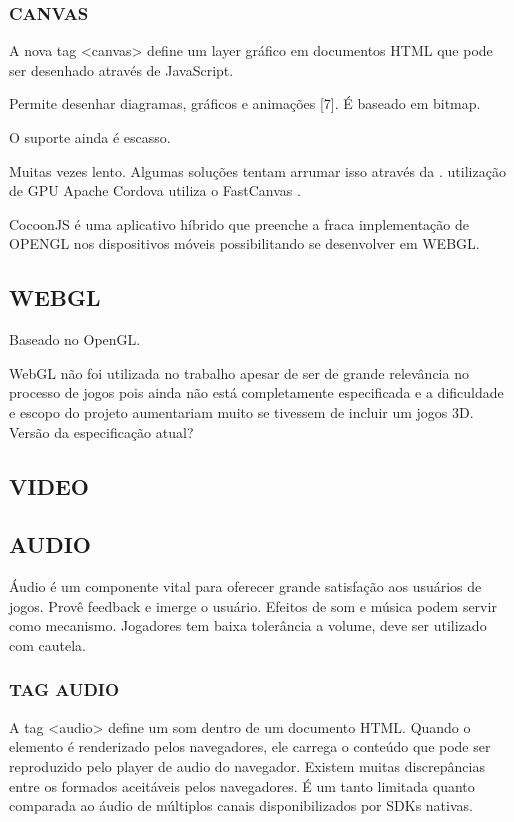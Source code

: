 \documentclass[11pt,a4paper]{article}
\begin{document}
\subsubsection{CANVAS}

A nova tag <canvas> define um layer gráfico em documentos HTML que pode
ser desenhado através de JavaScript.

Permite desenhar diagramas, gráficos e animações [7]. É baseado em
bitmap.

O suporte ainda é escasso.

Muitas vezes lento. Algumas soluções tentam arrumar isso através da .
utilização de GPU Apache Cordova utiliza o FastCanvas                .

CocoonJS é uma aplicativo híbrido que preenche a fraca implementação
de OPENGL nos dispositivos móveis possibilitando se desenvolver em
WEBGL.

\subsection{WEBGL}

Baseado no OpenGL.

WebGL não foi utilizada no trabalho apesar de ser de grande
relevância no processo de jogos pois ainda não está completamente
especificada e a dificuldade e escopo do projeto aumentariam muito se
tivessem de incluir um jogos 3D. Versão da especificação atual?

\subsection{VIDEO}

\subsection{AUDIO}

Áudio é um componente vital para oferecer grande satisfação aos
usuários de jogos. Provê feedback e imerge o usuário. Efeitos de som
e música podem servir como mecanismo. Jogadores tem baixa tolerância a
volume, deve ser utilizado com cautela.

\subsubsection{TAG AUDIO}

A tag <audio> define um som dentro de um documento HTML. Quando o
elemento é renderizado pelos navegadores, ele carrega o conteúdo
que pode ser reproduzido pelo player de audio do navegador. Existem
muitas discrepâncias entre os formados aceitáveis pelos navegadores.
É um tanto limitada quanto comparada ao áudio de múltiplos canais
disponibilizados por SDKs nativas.
\end{document}
